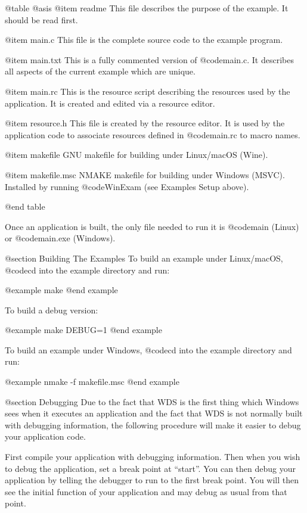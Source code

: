 @table @asis
@item readme
This file describes the purpose of the example.  It should be read
first.

@item main.c
This file is the complete source code to the example program.

@item main.txt
This is a fully commented version of @code{main.c}.  It describes all
aspects of the current example which are unique.

@item main.rc
This is the resource script describing the resources used by the
application.  It is created and edited via a resource editor.

@item resource.h
This file is created by the resource editor.  It is used by the
application code to associate resources defined in @code{main.rc} to
macro names.

@item makefile
GNU makefile for building under Linux/macOS (Wine).

@item makefile.msc
NMAKE makefile for building under Windows (MSVC).  Installed by
running @code{WinExam\setup\windows} (see Examples Setup above).

@end table


Once an application is built, the only file needed to run it is
@code{main} (Linux) or @code{main.exe} (Windows).



@section Building The Examples
To build an example under Linux/macOS, @code{cd} into the example
directory and run:

@example
make
@end example

To build a debug version:

@example
make DEBUG=1
@end example

To build an example under Windows, @code{cd} into the example
directory and run:

@example
nmake -f makefile.msc
@end example



@section Debugging
Due to the fact that WDS is the first thing which Windows sees
when it executes an application and the fact that WDS is not normally
built with debugging information, the following procedure will make it
easier to debug your application code.

First compile your application with debugging information.  Then when you
wish to debug the application, set a break point at ``start''.  You
can then debug your application by telling the debugger to run to the first
break point.  You will then see the initial function of your application
and may debug as usual from that point.

